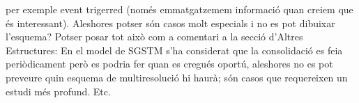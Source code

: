 per exemple event trigerred (només emmatgatzemem informació quan creiem que és interessant). Aleshores potser són casos molt especials i no es pot dibuixar l'esquema? Potser posar tot això com a comentari a la secció d'Altres Estructures: En el model de \gls{SGSTM} s'ha considerat que la consolidació es feia periòdicament però es podria fer quan es cregués oportú, aleshores no es pot preveure quin esquema de multiresolució hi haurà; són casos que requereixen un estudi més profund. Etc.
















